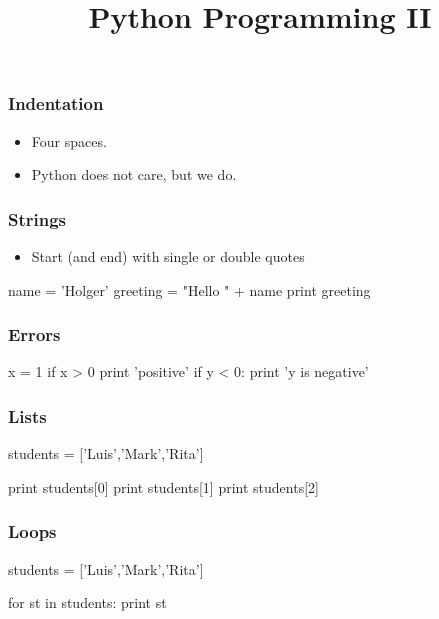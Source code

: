 
\title[Python II]{Python Programming II}


\frame{\maketitle}

\begin{frame}[fragile]
\frametitle{Indentation}
\begin{itemize}
\item Four spaces.
\item Python does not care, but we do.
\end{itemize}

\end{frame}

\begin{frame}[fragile]
\frametitle{Strings}

\begin{itemize}
\item Start (and end) with single or double quotes
\end{itemize}

\begin{python}

name = 'Holger'
greeting = "Hello " + name
print greeting
\end{python}

\end{frame}

\begin{frame}[fragile]
\frametitle{Errors}

\begin{python}
x = 1
if x > 0
    print 'positive'
if y < 0:
    print 'y is negative'
\end{python}

\end{frame}

\begin{frame}[fragile]
\frametitle{Lists}

\begin{python}

students = ['Luis','Mark','Rita']

print students[0]
print students[1]
print students[2]
\end{python}

\end{frame}

\begin{frame}[fragile]
\frametitle{Loops}

\begin{python}
students = ['Luis','Mark','Rita']

for st in students:
    print st
\end{python}
\end{frame}

